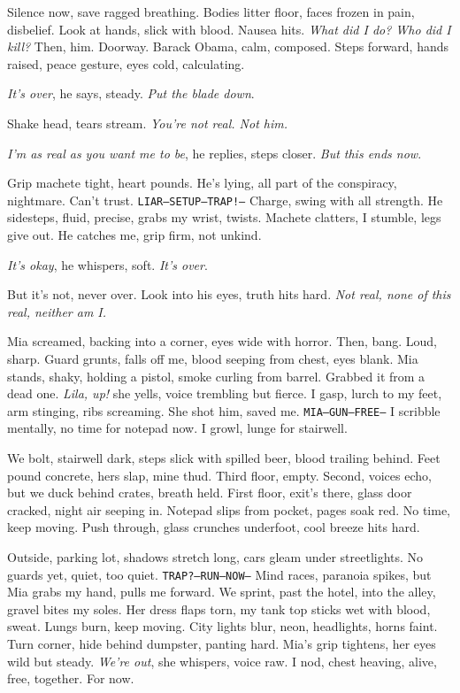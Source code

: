\documentclass[12pt,oneside]{book}
\newcommand{\note}[1]{\texttt{#1}}
\begin{document}
Silence now, save ragged breathing. Bodies litter floor, faces frozen in pain, disbelief. Look at hands, slick with blood. Nausea hits. \textit{What did I do? Who did I kill?} Then, him. Doorway. \textnormal{Barack Obama}, calm, composed. Steps forward, hands raised, peace gesture, eyes cold, calculating.

\textit{It’s over}, he says, steady. \textit{Put the blade down}.

Shake head, tears stream. \textit{You’re not real. Not him.}

\textit{I’m as real as you want me to be}, he replies, steps closer. \textit{But this ends now}.

Grip machete tight, heart pounds. He’s lying, all part of the conspiracy, nightmare. Can’t trust. \note{LIAR—SETUP—TRAP!—} Charge, swing with all strength. He sidesteps, fluid, precise, grabs my wrist, twists. Machete clatters, I stumble, legs give out. He catches me, grip firm, not unkind.

\textit{It’s okay}, he whispers, soft. \textit{It’s over}.

But it’s not, never over. Look into his eyes, truth hits hard. \textit{Not real, none of this real, neither am I.}

Mia screamed, backing into a corner, eyes wide with horror. Then, bang. Loud, sharp. Guard grunts, falls off me, blood seeping from chest, eyes blank. Mia stands, shaky, holding a pistol, smoke curling from barrel. Grabbed it from a dead one. \textit{Lila, up!} she yells, voice trembling but fierce. I gasp, lurch to my feet, arm stinging, ribs screaming. She shot him, saved me. \note{MIA—GUN—FREE—} I scribble mentally, no time for notepad now. I growl, lunge for stairwell.

We bolt, stairwell dark, steps slick with spilled beer, blood trailing behind. Feet pound concrete, hers slap, mine thud. Third floor, empty. Second, voices echo, but we duck behind crates, breath held. First floor, exit’s there, glass door cracked, night air seeping in. Notepad slips from pocket, pages soak red. No time, keep moving. Push through, glass crunches underfoot, cool breeze hits hard.

Outside, parking lot, shadows stretch long, cars gleam under streetlights. No guards yet, quiet, too quiet. \note{TRAP?—RUN—NOW—} Mind races, paranoia spikes, but Mia grabs my hand, pulls me forward. We sprint, past the hotel, into the alley, gravel bites my soles. Her dress flaps torn, my tank top sticks wet with blood, sweat. Lungs burn, keep moving. City lights blur, neon, headlights, horns faint. Turn corner, hide behind dumpster, panting hard. Mia’s grip tightens, her eyes wild but steady. \textit{We’re out}, she whispers, voice raw. I nod, chest heaving, alive, free, together. For now.
\end{document}
